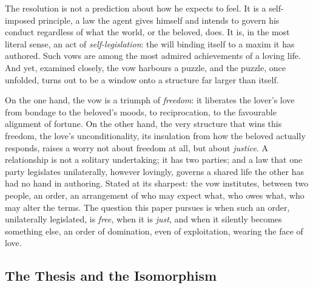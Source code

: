 The resolution is not a prediction about how he expects to feel. It is a self-imposed principle, a law the agent gives himself and intends to govern his conduct regardless of what the world, or the beloved, does. It is, in the most literal sense, an act of \emph{self-legislation}: the will binding itself to a maxim it has authored. Such vows are among the most admired achievements of a loving life. And yet, examined closely, the vow harbours a puzzle, and the puzzle, once unfolded, turns out to be a window onto a structure far larger than itself.

On the one hand, the vow is a triumph of \emph{freedom}: it liberates the lover's love from bondage to the beloved's moods, to reciprocation, to the favourable alignment of fortune. On the other hand, the very structure that wins this freedom, the love's unconditionality, its insulation from how the beloved actually responds, raises a worry not about freedom at all, but about \emph{justice}. A relationship is not a solitary undertaking; it has two parties; and a law that one party legislates unilaterally, however lovingly, governs a shared life the other has had no hand in authoring. Stated at its sharpest: the vow institutes, between two people, an order, an arrangement of who may expect what, who owes what, who may alter the terms. The question this paper pursues is when such an order, unilaterally legislated, is \emph{free}, when it is \emph{just}, and when it silently becomes something else, an order of domination, even of exploitation, wearing the face of love.

\subsection{The Thesis and the Isomorphism}

